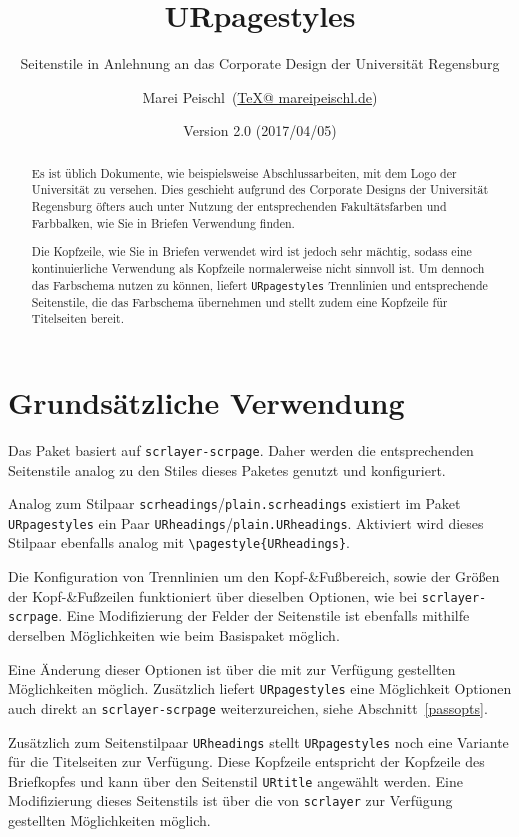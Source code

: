 \documentclass[ngerman,headsepline=3pt,headinclude=true]{scrartcl}
\title{URpagestyles}
\subtitle{Seitenstile in Anlehnung an das Corporate Design der Universität Regensburg}
\date{Version 2.0 (2017/04/05)}
\author{Marei Peischl~(\href{mailto:TeX@mareipeischl.de}{TeX@ mareipeischl.de})}
\newcommand*{\pck}[1]{\texttt{#1}}
\newcommand*{\code}[1]{\texttt{#1}}
\begin{document}
\maketitle

\begin{abstract}
	\noindent Es ist üblich Dokumente, wie beispielsweise Abschlussarbeiten, mit dem Logo der Universität zu versehen. Dies geschieht aufgrund des Corporate Designs der Universität Regensburg öfters auch unter Nutzung der entsprechenden Fakultätsfarben und Farbbalken, wie Sie in Briefen Verwendung finden.
	
	Die Kopfzeile, wie Sie in Briefen verwendet wird ist jedoch sehr mächtig, sodass eine kontinuierliche Verwendung als Kopfzeile normalerweise nicht sinnvoll ist. Um dennoch das Farbschema nutzen zu können, liefert \pck{URpagestyles} Trennlinien und entsprechende Seitenstile, die das Farbschema übernehmen und stellt zudem eine Kopfzeile für Titelseiten bereit.
\end{abstract}

\section{Grundsätzliche Verwendung}
Das Paket basiert auf \pck{scrlayer-scrpage}. Daher werden die entsprechenden Seitenstile analog zu den Stiles dieses Paketes genutzt und konfiguriert.

Analog zum Stilpaar \code{scrheadings}/\code{plain.scrheadings} existiert im Paket \pck{URpagestyles} ein Paar \code{URheadings}/\code{plain.URheadings}. 
Aktiviert wird dieses Stilpaar ebenfalls analog mit \code{\textbackslash{}pagestyle\{URheadings\}}.

Die Konfiguration von Trennlinien um den Kopf-\&Fußbereich, sowie der Größen der Kopf-\&Fußzeilen funktioniert über dieselben Optionen, wie bei \pck{scrlayer-scrpage}. Eine Modifizierung der Felder der Seitenstile ist ebenfalls mithilfe derselben Möglichkeiten wie beim Basispaket möglich.

Eine Änderung dieser Optionen ist über die mit \KOMAScript{} zur Verfügung gestellten Möglichkeiten möglich.
Zusätzlich liefert \pck{URpagestyles} eine Möglichkeit Optionen auch direkt an \pck{scrlayer-scrpage} weiterzureichen, siehe 
Abschnitt~\ref{passopts}.

Zusätzlich zum Seitenstilpaar \code{URheadings} stellt  \pck{URpagestyles} noch eine Variante für die Titelseiten zur Verfügung. Diese Kopfzeile entspricht der Kopfzeile des Briefkopfes und kann über den Seitenstil \code{URtitle} angewählt werden. Eine Modifizierung dieses Seitenstils ist über die von \pck{scrlayer} zur Verfügung gestellten Möglichkeiten möglich.
\end{document}
